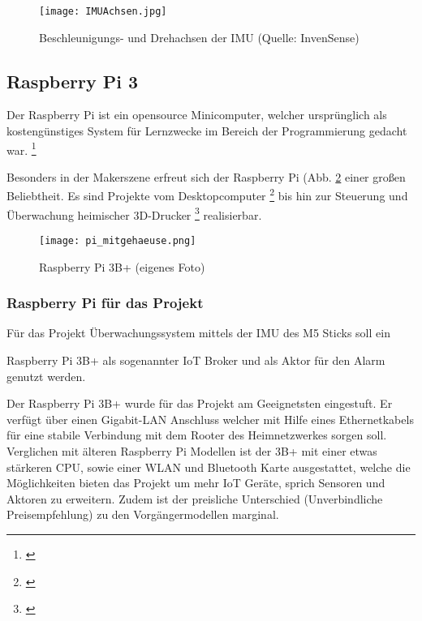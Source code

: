 \documentclass[a4paper,12pt]{article}
\begin{document}
\begin{figure}[H]	%
\begin{center}
\texttt{[image: IMUAchsen.jpg]}
\caption{Beschleunigungs- und Drehachsen der IMU
(Quelle: InvenSense)}
\label{IMUAchsen}
\end{center}
\end{figure}

\subsection{Raspberry Pi 3}
Der Raspberry Pi ist ein opensource Minicomputer, welcher ursprünglich als kostengünstiges System für Lernzwecke im Bereich der Programmierung gedacht war. \footnote{\cite{RaspberryPi.20.08.2015}} \par
Besonders in der Makerszene erfreut sich der Raspberry Pi (Abb. \ref{pi_mitgehaeuse} einer großen Beliebtheit. Es sind Projekte vom Desktopcomputer \footnote{\cite{RaspberryPi.20.08.2015}} bis hin zur Steuerung und Überwachung heimischer 3D-Drucker \footnote{\cite{Hauge.20.04.2022}} realisierbar.\\[3mm]


	\begin{figure}[H]
	\centering
	\texttt{[image: pi\_mitgehaeuse.png]}
	\caption{Raspberry Pi 3B+ (eigenes Foto)}
	\label{pi_mitgehaeuse}
\end{figure}	


\subsubsection{Raspberry Pi für das Projekt}
Für das Projekt Überwachungssystem mittels der IMU des M5 Sticks soll ein\par 
Raspberry Pi 3B+ als sogenannter IoT Broker und als Aktor für den Alarm genutzt werden.\par
Der Raspberry Pi 3B+ wurde für das Projekt am Geeignetsten eingestuft. Er verfügt über einen Gigabit-LAN Anschluss welcher mit Hilfe eines Ethernetkabels für eine stabile Verbindung mit dem Rooter des Heimnetzwerkes sorgen soll. Verglichen mit älteren Raspberry Pi Modellen ist der 3B+ mit einer etwas stärkeren CPU, sowie einer WLAN und Bluetooth Karte ausgestattet, welche die Möglichkeiten bieten das Projekt um mehr IoT Geräte, sprich Sensoren und Aktoren zu erweitern. Zudem ist der preisliche Unterschied (Unverbindliche Preisempfehlung) zu den Vorgängermodellen marginal.  
\end{document}
